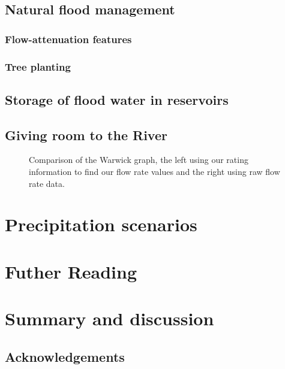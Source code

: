 \documentclass[11pt,a4paper]{article}
\begin{document}
\subsection{Natural flood management}
\subsubsection{Flow-attenuation features}
\subsubsection{Tree planting}
\subsection{Storage of flood water in reservoirs}
\subsection{Giving room to the River}
\begin{figure}[H]
\centering
{}
\hfill
{}
\caption{Comparison of the Warwick graph, the left using our rating information to find our flow rate values and the right using raw flow rate data.}
\end{figure}

\section{Precipitation scenarios}

\section{Futher Reading}

\section{Summary and discussion}
\subsection{Acknowledgements}
\end{document}
